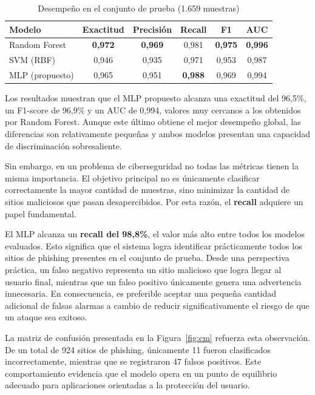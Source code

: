 \documentclass[conference]{IEEEtran}
\begin{document}
\begin{table}[t]
\centering
\caption{Desempeño en el conjunto de prueba (1.659 muestras)}
\label{tab:results}
\begin{tabular}{lccccc}
\hline
\textbf{Modelo} & \textbf{Exactitud} & \textbf{Precisión} & \textbf{Recall} & \textbf{F1} & \textbf{AUC} \\
\hline
Random Forest & \textbf{0,972} & \textbf{0,969} & 0,981 & \textbf{0,975} & \textbf{0,996} \\
SVM (RBF) & 0,946 & 0,935 & 0,971 & 0,953 & 0,987 \\
MLP (propuesto) & 0,965 & 0,951 & \textbf{0,988} & 0,969 & 0,994 \\
\hline
\end{tabular}
\end{table}

Los resultados muestran que el MLP propuesto alcanza una exactitud del 96,5\%, un F1-score de 96,9\% y un AUC de 0,994, valores muy cercanos a los obtenidos por Random Forest. Aunque este último obtiene el mejor desempeño global, las diferencias son relativamente pequeñas y ambos modelos presentan una capacidad de discriminación sobresaliente.

Sin embargo, en un problema de ciberseguridad no todas las métricas tienen la misma importancia. El objetivo principal no es únicamente clasificar correctamente la mayor cantidad de muestras, sino minimizar la cantidad de sitios maliciosos que pasan desapercibidos. Por esta razón, el \textbf{recall} adquiere un papel fundamental.

El MLP alcanza un \textbf{recall del 98,8\%}, el valor más alto entre todos los modelos evaluados. Esto significa que el sistema logra identificar prácticamente todos los sitios de phishing presentes en el conjunto de prueba. Desde una perspectiva práctica, un falso negativo representa un sitio malicioso que logra llegar al usuario final, mientras que un falso positivo únicamente genera una advertencia innecesaria. En consecuencia, es preferible aceptar una pequeña cantidad adicional de falsas alarmas a cambio de reducir significativamente el riesgo de que un ataque sea exitoso.

La matriz de confusión presentada en la Figura~\ref{fig:cm} refuerza esta observación. De un total de 924 sitios de phishing, únicamente 11 fueron clasificados incorrectamente, mientras que se registraron 47 falsos positivos. Este comportamiento evidencia que el modelo opera en un punto de equilibrio adecuado para aplicaciones orientadas a la protección del usuario.
\end{document}
